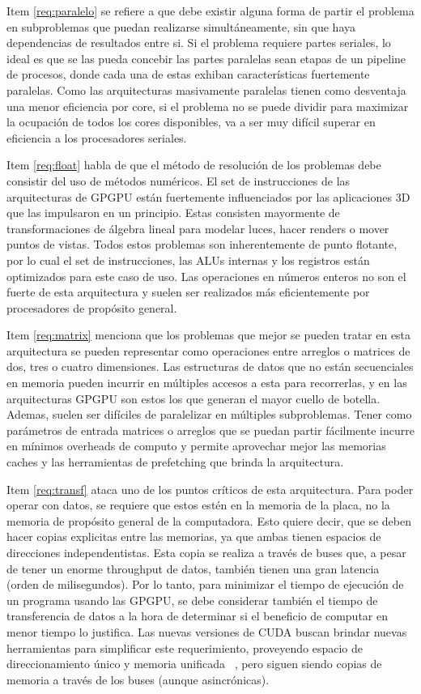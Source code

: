 Item \ref{req:paralelo} se refiere a que debe existir alguna forma de partir el problema
en subproblemas que puedan realizarse simult\'aneamente, sin que haya dependencias de
resultados entre si. Si el problema requiere partes seriales, lo ideal es que se las
pueda concebir las partes paralelas sean etapas de un pipeline de procesos, donde
cada una de estas exhiban caracter\'isticas fuertemente paralelas. Como las arquitecturas
masivamente paralelas tienen como desventaja una menor eficiencia por core, si el
problema no se puede dividir para maximizar la ocupaci\'on de todos los cores disponibles,
va a ser muy dif\'icil superar en eficiencia a los procesadores seriales.

Item \ref{req:float} habla de que el m\'etodo de resoluci\'on de los problemas debe
consistir del uso de m\'etodos num\'ericos. El set de instrucciones de las arquitecturas
de GPGPU est\'an fuertemente influenciados por las aplicaciones 3D que las impulsaron
en un principio. Estas consisten mayormente de transformaciones de \'algebra lineal
para modelar luces, hacer renders o mover puntos de vistas. Todos estos problemas
son inherentemente de punto flotante, por lo cual el set de instrucciones, las ALUs
internas y los registros est\'an optimizados para este caso de uso. Las operaciones
en n\'umeros enteros no son el fuerte de esta arquitectura y suelen ser realizados
m\'as eficientemente por procesadores de prop\'osito general.

Item \ref{req:matrix} menciona que los problemas que mejor se pueden tratar en esta
arquitectura se pueden representar como operaciones entre arreglos o matrices de
dos, tres o cuatro dimensiones. Las estructuras de datos que no est\'an secuenciales
en memoria pueden incurrir en m\'ultiples accesos a esta para recorrerlas, y en las
arquitecturas GPGPU son estos los que generan el mayor cuello de botella. Ademas,
suelen ser dif\'iciles de paralelizar en m\'ultiples subproblemas. Tener como par\'ametros de
entrada matrices o arreglos que se puedan partir f\'acilmente incurre en m\'inimos
overheads de computo y permite aprovechar mejor las memorias caches y las herramientas de
prefetching que brinda la arquitectura.

Item \ref{req:transf} ataca uno de los puntos cr\'iticos de esta arquitectura. Para poder
operar con datos, se requiere que estos est\'en en la memoria de la placa, no la memoria
de prop\'osito general de la computadora. Esto quiere decir, que se deben hacer copias
explicitas entre las memorias, ya que ambas tienen espacios de direcciones independentistas.
Esta copia se realiza a trav\'es de buses que, a pesar de tener un enorme throughput de
datos, tambi\'en tienen una gran latencia (orden de milisegundos). Por lo tanto, para minimizar
el tiempo de ejecuci\'on de un programa usando las GPGPU, se debe considerar tambi\'en el
tiempo de transferencia de datos a la hora de determinar si el beneficio de computar en
menor tiempo lo justifica. Las nuevas versiones de CUDA buscan brindar nuevas herramientas
para simplificar este requerimiento, proveyendo espacio de direccionamiento \'unico y
memoria unificada ~\cite{farberCuda}, pero siguen siendo copias de memoria a trav\'es de los
buses (aunque asincr\'onicas).

